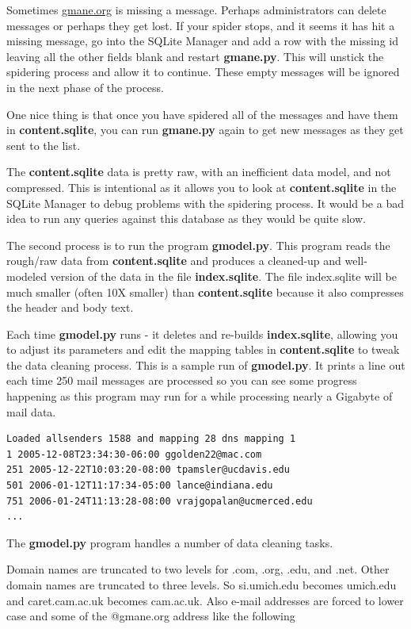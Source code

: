 \documentclass[11pt]{book}
\begin{document}
Sometimes \url{gmane.org} is missing a message.  Perhaps administrators can delete messages
or perhaps they get lost.   If your spider stops, and it seems it has hit
a missing message, go into the SQLite Manager and add a row with the missing id leaving
all the other fields blank and restart {\bf gmane.py}.   This will unstick the 
spidering process and allow it to continue.  These empty messages will be ignored in the next
phase of the process.

One nice thing is that once you have spidered all of the messages and have them in 
{\bf content.sqlite}, you can run {\bf gmane.py} again to get new messages as 
they get sent to the list.  

The {\bf content.sqlite} data is pretty raw, with an inefficient data model, 
and not compressed.
This is intentional as it allows you to look at {\bf content.sqlite}
in the SQLite Manager to debug problems with the spidering process.
It would be a bad idea to run any queries against this database as they 
would be quite slow.

The second process is to run the program {\bf gmodel.py}.  This program reads the rough/raw 
data from {\bf content.sqlite} and produces a cleaned-up and well-modeled version of the 
data in the file {\bf index.sqlite}.  The file index.sqlite will be much smaller (often 10X
smaller) than {\bf content.sqlite} because it also compresses the header and body text.

Each time {\bf gmodel.py} runs - it deletes and re-builds {\bf index.sqlite}, allowing
you to adjust its parameters and edit the mapping tables in {\bf content.sqlite} to tweak the 
data cleaning process. This is a sample run of {\bf gmodel.py}.  It prints a line out each time
250 mail messages are processed so you can see some progress happening as this program may
run for a while processing nearly a Gigabyte of mail data.

\beforeverb
\begin{verbatim}
Loaded allsenders 1588 and mapping 28 dns mapping 1
1 2005-12-08T23:34:30-06:00 ggolden22@mac.com
251 2005-12-22T10:03:20-08:00 tpamsler@ucdavis.edu
501 2006-01-12T11:17:34-05:00 lance@indiana.edu
751 2006-01-24T11:13:28-08:00 vrajgopalan@ucmerced.edu
...
\end{verbatim}
\afterverb
%

The {\bf gmodel.py} program handles a number of data cleaning tasks.

Domain names are truncated to two levels for .com, .org, .edu, and .net.
Other domain names are truncated to three levels.  So si.umich.edu becomes
umich.edu and caret.cam.ac.uk becomes cam.ac.uk.   Also e-mail addresses are
forced to lower case and some of the @gmane.org address like the following
\end{document}
